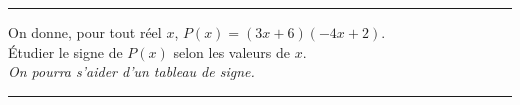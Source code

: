 \hrule


\begin{exo}[3 points]
 On donne, pour tout r\'eel $x$, $P(x)=(3x+6)(-4x+2)$.\\
 \'Etudier le signe de $P(x)$ selon les valeurs de $x$.\\
 \emph{On pourra s'aider d'un tableau de signe.}
\end{exo}

\hrule








\setcounter{chapter}{\thechaptertemp} %
